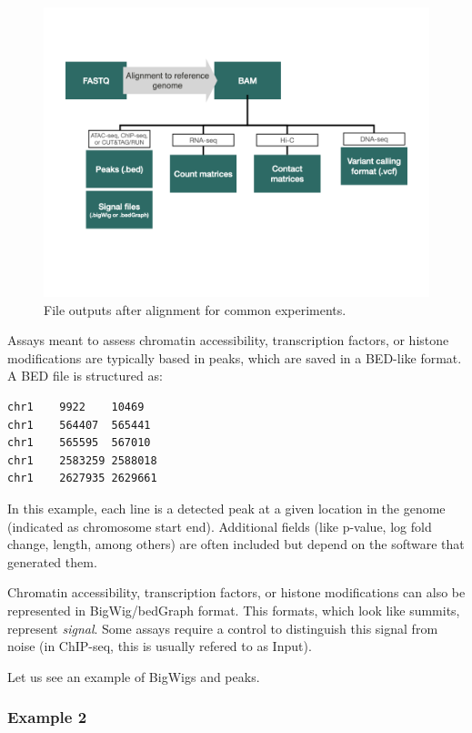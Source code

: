 \documentclass[
]{book}
\begin{document}
\begin{figure}
\centering
\includegraphics{figures/fileformatorigin.png}
\caption{File outputs after alignment for common experiments.}
\end{figure}

Assays meant to assess chromatin accessibility, transcription factors, or histone modifications are typically based in peaks, which are saved in a BED-like format. A BED file is structured as:

\begin{verbatim}
chr1    9922    10469   
chr1    564407  565441  
chr1    565595  567010  
chr1    2583259 2588018 
chr1    2627935 2629661 
\end{verbatim}

In this example, each line is a detected peak at a given location in the genome (indicated as chromosome start end). Additional fields (like p-value, log fold change, length, among others) are often included but depend on the software that generated them.

Chromatin accessibility, transcription factors, or histone modifications can also be represented in BigWig/bedGraph format. This formats, which look like summits, represent \emph{signal}. Some assays require a control to distinguish this signal from noise (in ChIP-seq, this is usually refered to as Input).

Let us see an example of BigWigs and peaks.

\hypertarget{example-2}{%
\subsubsection{Example 2}\label{example-2}}
\end{document}
